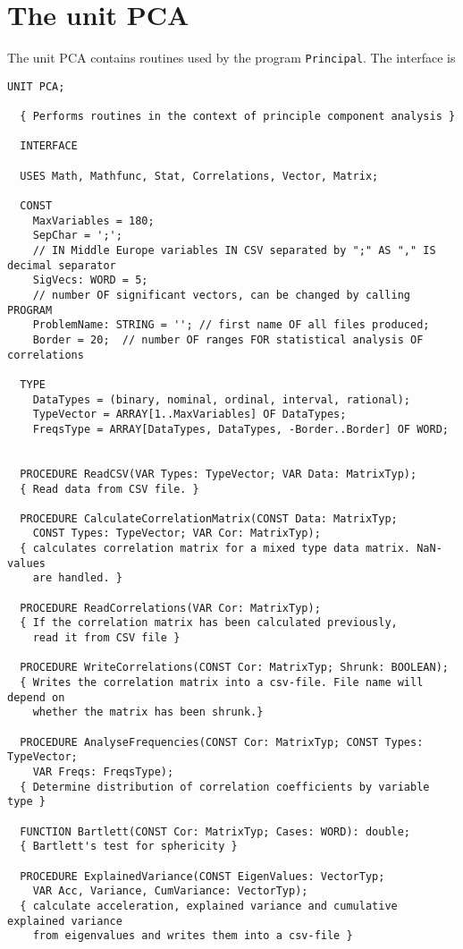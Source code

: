 \section{The unit PCA}

The unit \acs{PCA} contains routines used by the program \texttt{Principal}. The interface is

\begin{lstlisting}[caption=Interface of unit PCA]
  UNIT PCA;

  { Performs routines in the context of principle component analysis }

  INTERFACE

  USES Math, Mathfunc, Stat, Correlations, Vector, Matrix;

  CONST
    MaxVariables = 180;
    SepChar = ';';
    // IN Middle Europe variables IN CSV separated by ";" AS "," IS decimal separator
    SigVecs: WORD = 5;
    // number OF significant vectors, can be changed by calling PROGRAM
    ProblemName: STRING = ''; // first name OF all files produced;
    Border = 20;  // number OF ranges FOR statistical analysis OF correlations

  TYPE
    DataTypes = (binary, nominal, ordinal, interval, rational);
    TypeVector = ARRAY[1..MaxVariables] OF DataTypes;
    FreqsType = ARRAY[DataTypes, DataTypes, -Border..Border] OF WORD;


  PROCEDURE ReadCSV(VAR Types: TypeVector; VAR Data: MatrixTyp);
  { Read data from CSV file. }

  PROCEDURE CalculateCorrelationMatrix(CONST Data: MatrixTyp;
    CONST Types: TypeVector; VAR Cor: MatrixTyp);
  { calculates correlation matrix for a mixed type data matrix. NaN-values
    are handled. }

  PROCEDURE ReadCorrelations(VAR Cor: MatrixTyp);
  { If the correlation matrix has been calculated previously,
    read it from CSV file }

  PROCEDURE WriteCorrelations(CONST Cor: MatrixTyp; Shrunk: BOOLEAN);
  { Writes the correlation matrix into a csv-file. File name will depend on
    whether the matrix has been shrunk.}

  PROCEDURE AnalyseFrequencies(CONST Cor: MatrixTyp; CONST Types: TypeVector;
    VAR Freqs: FreqsType);
  { Determine distribution of correlation coefficients by variable type }

  FUNCTION Bartlett(CONST Cor: MatrixTyp; Cases: WORD): double;
  { Bartlett's test for sphericity }

  PROCEDURE ExplainedVariance(CONST EigenValues: VectorTyp;
    VAR Acc, Variance, CumVariance: VectorTyp);
  { calculate acceleration, explained variance and cumulative explained variance
    from eigenvalues and writes them into a csv-file }


\end{lstlisting}
